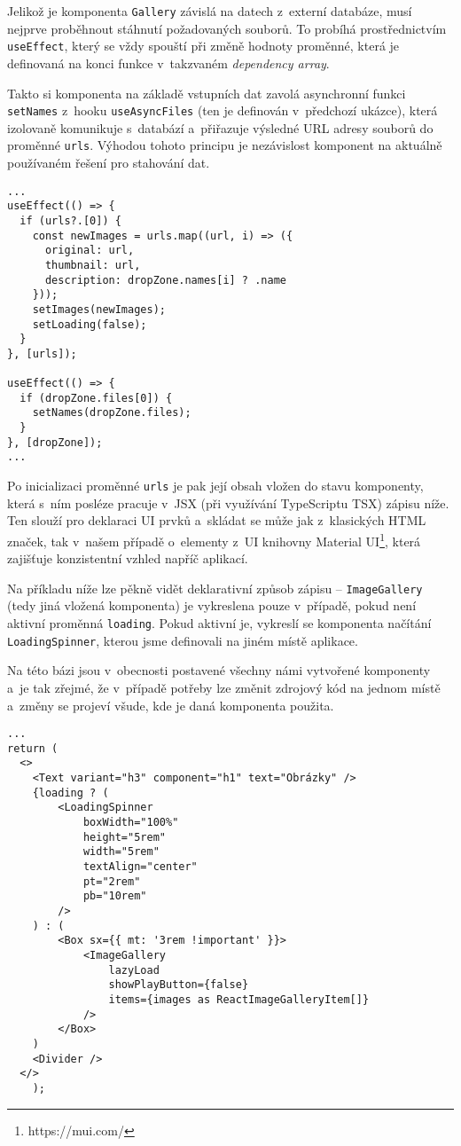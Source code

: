 Jelikož je komponenta \verb|Gallery| závislá na datech z~externí databáze, musí nejprve proběhnout stáhnutí požadovaných souborů. To probíhá prostřednictvím \verb|useEffect|, který se vždy spouští při změně hodnoty proměnné, která je definovaná na konci funkce v~takzvaném \emph{dependency array}.

Takto si komponenta na základě vstupních dat zavolá asynchronní funkci \verb|setNames| z~hooku \verb|useAsyncFiles| (ten je definován v~předchozí ukázce), která izolovaně komunikuje s~databází a~přiřazuje výsledné URL adresy souborů do proměnné \verb|urls|. Výhodou tohoto principu je nezávislost komponent na aktuálně používaném řešení pro stahování dat.

\begin{verbatim}
...
useEffect(() => {
  if (urls?.[0]) {
    const newImages = urls.map((url, i) => ({
      original: url,
      thumbnail: url,
      description: dropZone.names[i] ? .name
    }));
    setImages(newImages);
    setLoading(false);
  }
}, [urls]);

useEffect(() => {
  if (dropZone.files[0]) {
    setNames(dropZone.files);
  }
}, [dropZone]);
...
\end{verbatim}

Po inicializaci proměnné \verb|urls| je pak její obsah vložen do stavu komponenty, která s~ním posléze pracuje v~JSX (při využívání TypeScriptu TSX) zápisu níže. Ten slouží pro deklaraci UI prvků a~skládat se může jak z~klasických HTML značek, tak v~našem případě o~elementy z~UI knihovny Material UI\footnote{https://mui.com/}, která zajišťuje konzistentní vzhled napříč aplikací.

Na příkladu níže lze pěkně vidět deklarativní způsob zápisu -- \verb|ImageGallery| (tedy jiná vložená komponenta) je vykreslena pouze v~případě, pokud není aktivní proměnná \verb|loading|. Pokud aktivní je, vykreslí se komponenta načítání \verb|LoadingSpinner|, kterou jsme definovali na jiném místě aplikace.

Na této bázi jsou v~obecnosti postavené všechny námi vytvořené komponenty a~je tak zřejmé, že v~případě potřeby lze změnit zdrojový kód na jednom místě a~změny se projeví všude, kde je daná komponenta použita.

\begin{verbatim}
...
return (
  <>
    <Text variant="h3" component="h1" text="Obrázky" />
    {loading ? (
        <LoadingSpinner
            boxWidth="100%"
            height="5rem"
            width="5rem"
            textAlign="center"
            pt="2rem"
            pb="10rem"
        />
    ) : (
        <Box sx={{ mt: '3rem !important' }}>
            <ImageGallery
                lazyLoad
                showPlayButton={false}
                items={images as ReactImageGalleryItem[]}
            />
        </Box>
    ) 
    <Divider />
  </>
    );
\end{verbatim}


